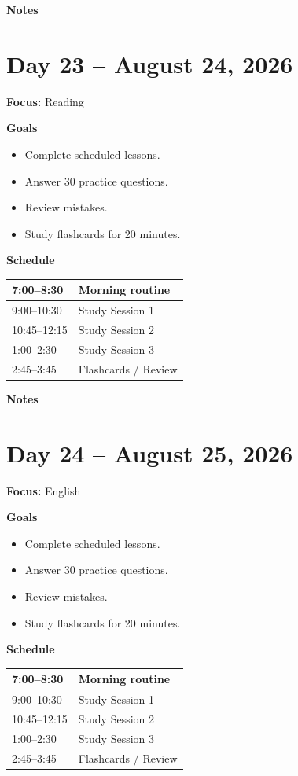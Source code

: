 \vspace{1em}
\textbf{Notes}

\vspace{8cm}

\newpage

\section*{Day 23 -- August 24, 2026}
\textbf{Focus:} Reading

\textbf{Goals}
\begin{itemize}
\item Complete scheduled lessons.
\item Answer 30 practice questions.
\item Review mistakes.
\item Study flashcards for 20 minutes.
\end{itemize}

\textbf{Schedule}
\begin{tabular}{|p{4cm}|p{10cm}|}\hline
7:00--8:30 & Morning routine \\\hline
9:00--10:30 & Study Session 1 \\\hline
10:45--12:15 & Study Session 2 \\\hline
1:00--2:30 & Study Session 3 \\\hline
2:45--3:45 & Flashcards / Review \\\hline
\end{tabular}

\vspace{1em}
\textbf{Notes}

\vspace{8cm}

\newpage

\section*{Day 24 -- August 25, 2026}
\textbf{Focus:} English

\textbf{Goals}
\begin{itemize}
\item Complete scheduled lessons.
\item Answer 30 practice questions.
\item Review mistakes.
\item Study flashcards for 20 minutes.
\end{itemize}

\textbf{Schedule}
\begin{tabular}{|p{4cm}|p{10cm}|}\hline
7:00--8:30 & Morning routine \\\hline
9:00--10:30 & Study Session 1 \\\hline
10:45--12:15 & Study Session 2 \\\hline
1:00--2:30 & Study Session 3 \\\hline
2:45--3:45 & Flashcards / Review \\\hline
\end{tabular}

